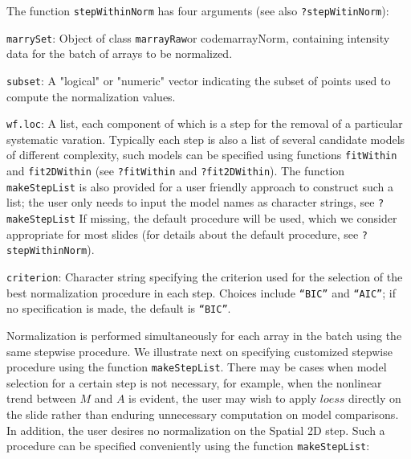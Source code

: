 \documentclass[11pt]{article}
\newcommand{\code}[1]{{\tt #1}}
\newcommand{\Rfunc}[1]{{\tt #1}}
\begin{document}
The function \Rfunc{stepWithinNorm} has four arguments (see also \code{?stepWitinNorm}): 
\begin{description}
  \item
    {\code{marrySet}:} Object of class \code{marrayRaw}or code{marrayNorm}, containing intensity 
    data for the batch of arrays to be normalized. 
  \item
    {\code{subset}:} A "logical" or "numeric" vector indicating the subset of points used to 
    compute the  normalization values.
  \item
    {\code{wf.loc}:} A list, each component of which is a step for the removal of a particular 
    systematic varation. Typically each step is also a list of several candidate models of 
    different complexity, such models can be specified using functions \Rfunc{fitWithin} and 
    \Rfunc{fit2DWithin} (see \code{?fitWithin} and \code{?fit2DWithin}). The function
    \Rfunc{makeStepList} is also provided for a user friendly approach to construct such a list;
    the user only needs to input the model names as character strings, see \code{?makeStepList}
    If missing, the default procedure will be used, which we consider appropriate for most slides
    (for details about the default procedure, see \code{?stepWithinNorm}).
  \item
    {\code{criterion}:} Character string specifying the criterion used for the selection of the
    best normalization procedure in each step. Choices include \code{``BIC''} and \code{``AIC''};
    if no specification is made, the default is \code{``BIC''}.
\end{description}

Normalization is performed simultaneously for each array in the batch using the same stepwise
procedure. We illustrate next on specifying customized stepwise procedure using the function
\Rfunc{makeStepList}. 
There may be cases when model selection for a certain step is not necessary, for example, when
the nonlinear trend between $M$ and $A$ is evident, the user may wish to apply $loess$ directly 
on the slide rather than enduring unnecessary computation on model comparisons. In addition, the
user desires no normalization on the Spatial 2D step. Such a procedure can be specified 
conveniently using the function \Rfunc{makeStepList}:
\end{document}

